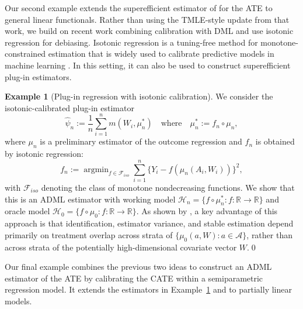 \documentclass[11pt]{article}
\DeclareMathOperator*{\argmin}{argmin}
\theoremstyle{definition}
\newtheorem{example}{Example}
\begin{document}
Our second example extends the superefficient estimator of \citet{ATEsupereff} for the ATE to general linear functionals. Rather than using the TMLE-style update from that work, we build on recent work combining calibration with DML \citep{van2024automatic,van2025automatic} and use isotonic regression for debiasing. Isotonic regression \citep{barlow1972isotonic} is a tuning-free method for monotone-constrained estimation that is widely used to calibrate predictive models in machine learning \citep{zadrozny2001obtaining,niculescu2005predicting,van2024self,van2025generalized}. In this setting, it can also be used to construct superefficient plug-in estimators.

\begin{example}[Plug-in regression with isotonic calibration]
\label{example::map}
We consider the isotonic-calibrated plug-in estimator
\[
\widehat{\psi}_n:=\frac{1}{n}\sum_{i=1}^n m(W_i,\mu_n^*)  \quad \text{where} \quad\mu_n^*:=f_n\circ\mu_n,
\]
where \(\mu_n\) is a preliminary estimator of the outcome regression and \(f_n\) is obtained by isotonic regression:
\[
f_n:=\argmin_{f\in\mathcal{F}_{iso}}\sum_{i=1}^n\{Y_i-f(\mu_n(A_i,W_i))\}^2,
\]
with \(\mathcal{F}_{iso}\) denoting the class of monotone nondecreasing functions. We show that this is an ADML estimator with working model \(\mathcal{H}_n=\{f\circ\mu_n^*: f:\mathbb{R}\to\mathbb{R}\}\) and oracle model \(\mathcal{H}_0=\{f\circ\mu_0: f:\mathbb{R}\to\mathbb{R}\}\). As shown by \citet{ATEsupereff}, a key advantage of this approach is that identification, estimator variance, and stable estimation depend primarily on treatment overlap across strata of \(\{\mu_0(a,W): a \in \mathcal{A}\}\), rather than across strata of the potentially high-dimensional covariate vector \(W\).\qed 

 
\end{example}

 

Our final example combines the previous two ideas to construct an ADML estimator of the ATE by calibrating the CATE within a semiparametric regression model. It extends the estimators in Example~\ref{example::map} and \citet{ATEsupereff} to partially linear models.
\end{document}
